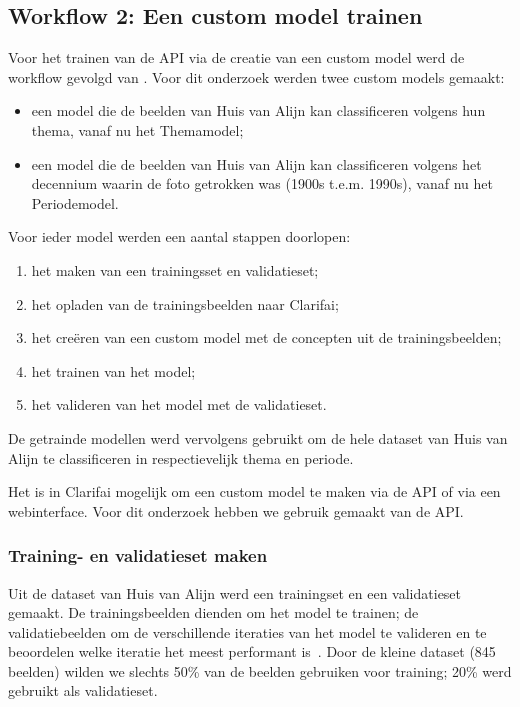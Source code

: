 \subsection{Workflow 2: Een custom model trainen}
\label{subsec:workflow2}

Voor het trainen van de API via de creatie van een custom model werd de workflow gevolgd van \textcite{ClarifaiAPI}. Voor dit onderzoek werden twee custom models gemaakt:
\begin{itemize}
	\item een model die de beelden van Huis van Alijn kan classificeren volgens hun thema, vanaf nu het Themamodel;
	\item een model die de beelden van Huis van Alijn kan classificeren volgens het decennium waarin de foto getrokken was (1900s t.e.m. 1990s), vanaf nu het Periodemodel.
\end{itemize}

Voor ieder model werden een aantal stappen doorlopen:
\begin{enumerate}
	\item het maken van een trainingsset en validatieset;
	\item het opladen van de trainingsbeelden naar Clarifai;
	\item het creëren van een custom model met de concepten uit de trainingsbeelden;
	\item het trainen van het model;
	\item het valideren van het model met de validatieset.
\end{enumerate}

De getrainde modellen werd vervolgens gebruikt om de hele dataset van Huis van Alijn te classificeren in respectievelijk thema en periode. 

Het is in Clarifai mogelijk om een custom model te maken via de API of via een webinterface. Voor dit onderzoek hebben we gebruik gemaakt van de API.

\subsubsection{Training- en validatieset maken}

Uit de dataset van Huis van Alijn werd een trainingset en een validatieset gemaakt. De trainingsbeelden dienden om het model te trainen; de validatiebeelden om de verschillende iteraties van het model te valideren en te beoordelen welke iteratie het meest performant is~\autocites{Lievens2017}{Brownlee2017}. Door de kleine dataset (845 beelden) wilden we slechts 50\% van de beelden gebruiken voor training; 20\% werd gebruikt als validatieset.

